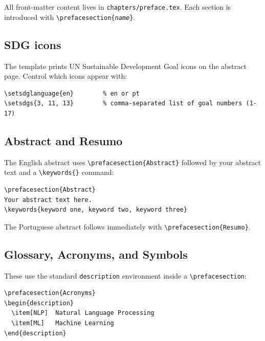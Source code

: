 All front-matter content lives in \texttt{chapters/preface.tex}.
Each section is introduced with \texttt{\textbackslash prefacesection\{\textit{name}\}}.

\subsection{SDG icons} \label{sec:sdg}

The template prints UN Sustainable Development Goal icons on the abstract page.
Control which icons appear with:

\begin{verbatim}
\setsdglanguage{en}        % en or pt
\setsdgs{3, 11, 13}        % comma-separated list of goal numbers (1-17)
\end{verbatim}

\subsection{Abstract and Resumo} \label{sec:abstract}

The English abstract uses \texttt{\textbackslash prefacesection\{Abstract\}} followed by
your abstract text and a \texttt{\textbackslash keywords\{\}} command:

\begin{verbatim}
\prefacesection{Abstract}
Your abstract text here.
\keywords{keyword one, keyword two, keyword three}
\end{verbatim}

The Portuguese abstract follows immediately with
\texttt{\textbackslash prefacesection\{Resumo\}}.

\subsection{Glossary, Acronyms, and Symbols}

These use the standard \texttt{description} environment inside a
\texttt{\textbackslash prefacesection}:

\begin{verbatim}
\prefacesection{Acronyms}
\begin{description}
  \item[NLP]  Natural Language Processing
  \item[ML]   Machine Learning
\end{description}
\end{verbatim}

